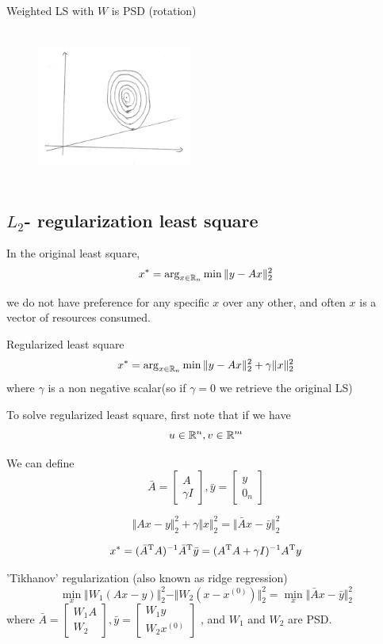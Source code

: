 Weighted LS with $W$ is PSD (rotation)

\begin{figure}
	\centering
	\includegraphics[width=2in,height=2in]{figures/ch06/ch06-05.jpg}
\end{figure}



\subsection{$L_2$- regularization least square}


In the original least square, 
$$x^*=\arg_{x\in\mathbb{R}_{n}} \min \Vert y-Ax\Vert ^2_2$$

we do not have preference for any specific $x$ over any other, and often $x$ is a vector of resources consumed.


Regularized least square
$$x^*=\arg_{x\in\mathbb{R}_{n}} \min \Vert y-Ax\Vert ^2_2 + \gamma \Vert x\Vert ^2_2$$
where $\gamma$ is a non negative scalar(so if $\gamma = 0$ we retrieve the original LS)


To solve regularized least square, first note that if we have
$$u\in\mathbb{R}^{n}, v\in\mathbb{R}^{m}$$

We can define 
$$
\bar{A}=
\begin{bmatrix}
A\\
\gamma I
\end{bmatrix}
,
\bar{y}=
\begin{bmatrix}
y\\
0_n
\end{bmatrix}
$$


$$\Vert Ax - y\Vert ^2_2 + \gamma \Vert x\Vert ^2_2=\Vert \bar{A}x-\bar{y}\Vert^2_2$$

$$x^*=(\bar{A}^{{\rm T}} A)^{-1} \bar{A}^{{\rm T}} \bar{y}=(A^{{\rm T}} A+\gamma I)^{-1} A^{{\rm T}} y$$


\vspace{0.5cm}
'Tikhanov' regularization (also known as ridge regression)
$$\min_x \Vert W_1 (Ax - y)\Vert^2_2 - \Vert W_2 (x - x^{(0)})\Vert^2_2 = \min_x \Vert \bar{A}x-\bar{y}\Vert^2_2 $$
where $\bar{A} = 
\begin{bmatrix}
W_1 A\\
W_2
\end{bmatrix}
,
\bar{y} = 
\begin{bmatrix}
	W_1 y\\
	W_2 x^{(0)}
\end{bmatrix}
$
, and $W_1$ and $W_2$ are PSD.


